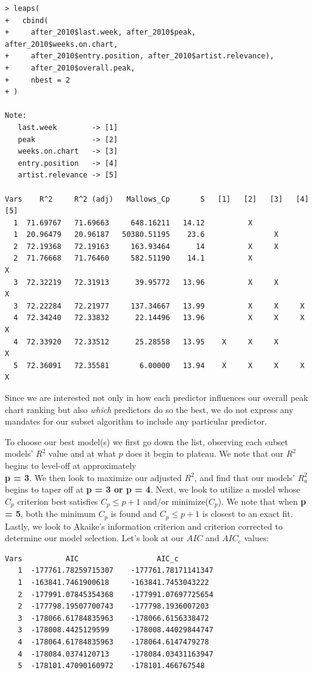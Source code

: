 \documentclass[11pt]{article} %
\begin{document}
\begin{verbatim}
> leaps(
+   cbind(
+     after_2010$last.week, after_2010$peak, after_2010$weeks.on.chart, 
+     after_2010$entry.position, after_2010$artist.relevance), 
+     after_2010$overall.peak, 
+     nbest = 2
+ )

Note: 
   last.week        -> [1]
   peak             -> [2]
   weeks.on.chart   -> [3]
   entry.position   -> [4]
   artist.relevance -> [5]
   
Vars    R^2     R^2 (adj)   Mallows_Cp       S   [1]   [2]   [3]   [4]   [5]
  1  71.69767   71.69663     648.16211   14.12          X
  1  20.96479   20.96187   50380.51195    23.6                X
  2  72.19368   72.19163     163.93464      14          X     X
  2  71.76668   71.76460     582.51190    14.1          X                 X
  3  72.32219   72.31913      39.95772   13.96          X     X           X
  3  72.22284   72.21977     137.34667   13.99          X     X     X
  4  72.34240   72.33832      22.14496   13.96          X     X     X     X
  4  72.33920   72.33512      25.28558   13.95    X     X     X           X
  5  72.36091   72.35581       6.00000   13.94    X     X     X     X     X
\end{verbatim}

Since we are interested not only in how each predictor influences our overall peak chart ranking but also \textit{which} predictors do so the best, we do not express any mandates for our subset algorithm to include any particular predictor. 

To choose our best model(s) we first go down the list, observing each subset models' $R^{2}$ value and at what $p$ does it begin to plateau. We note that our $R^{2}$ begins to level-off at approximately \\ \textbf{p = 3}. We then look to maximize our adjusted $R^{2}$, and find that our models' $R^{2}_{a}$ begins to taper off at \textbf{p = 3 or p = 4}. Next, we look to utilize a model whose $C_{p}$ criterion best satisfies $C_{p} \leq p + 1$ and/or minimize($C_{p}$). We note that when \textbf{p = 5}, both the minimum $C_{p}$ is found and $C_{p} \leq p + 1$ is closest to an exact fit. Lastly, we look to Akaike's information criterion and criterion corrected to determine our model selection. Let's look at our $AIC$ and $AIC_{c}$ values:

\begin{verbatim}
Vars          AIC                  AIC_c
   1  -177761.78259715307    -177761.78171141347
   1  -163841.7461900618     -163841.7453043222
   2  -177991.07845354368    -177991.07697725654
   2  -177798.19507700743    -177798.1936007203
   3  -178066.61784835963    -178066.6156338472
   3  -178008.4425129599     -178008.44029844747
   4  -178064.61784835963    -178064.6147479278
   4  -178084.0374120713     -178084.03431163947
   5  -178101.47090160972    -178101.466767548
\end{verbatim}
\end{document}
